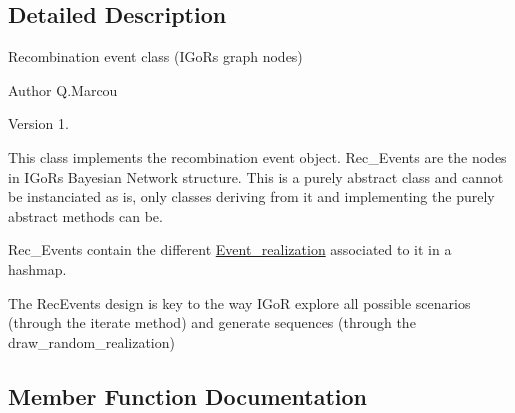 \subsection{Detailed Description}
Recombination event class (I\+GoR\textquotesingle{}s graph nodes) 

\begin{DoxyAuthor}{Author}
Q.\+Marcou 
\end{DoxyAuthor}
\begin{DoxyVersion}{Version}
1.
\end{DoxyVersion}
This class implements the recombination event object. Rec\+\_\+\+Events are the nodes in I\+GoR\textquotesingle{}s Bayesian Network structure. This is a purely abstract class and cannot be instanciated as is, only classes deriving from it and implementing the purely abstract methods can be.

Rec\+\_\+\+Events contain the different \hyperlink{structEvent__realization}{Event\+\_\+realization} associated to it in a hashmap.

The Rec\+Events design is key to the way I\+GoR explore all possible scenarios (through the iterate method) and generate sequences (through the draw\+\_\+random\+\_\+realization) 

\subsection{Member Function Documentation}
\mbox{\label{classRec__Event_a0fea607ec06bdd1a7f5ebb04a96e5253}} 
